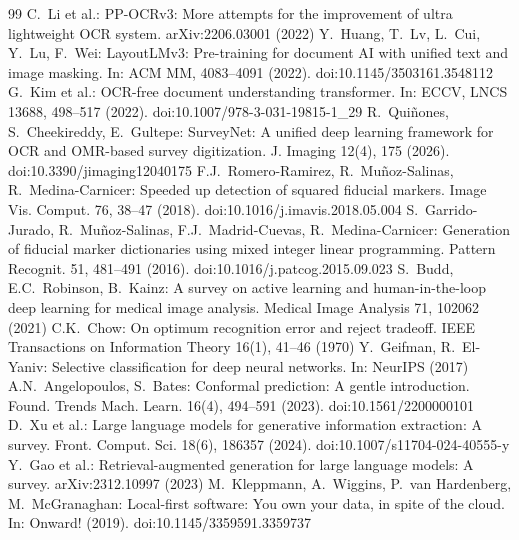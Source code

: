 \documentclass[runningheads]{llncs}
\begin{document}

\begin{thebibliography}{99}
 C.~Li et al.: PP-OCRv3: More attempts for the improvement of ultra lightweight OCR system. arXiv:2206.03001 (2022)
 Y.~Huang, T.~Lv, L.~Cui, Y.~Lu, F.~Wei: LayoutLMv3: Pre-training for document AI with unified text and image masking. In: ACM MM, 4083--4091 (2022). doi:10.1145/3503161.3548112
 G.~Kim et al.: OCR-free document understanding transformer. In: ECCV, LNCS 13688, 498--517 (2022). doi:10.1007/978-3-031-19815-1\_29
 R.~Qui{\~n}ones, S.~Cheekireddy, E.~Gultepe: SurveyNet: A unified deep learning framework for OCR and OMR-based survey digitization. J. Imaging 12(4), 175 (2026). doi:10.3390/jimaging12040175
 F.J.~Romero-Ramirez, R.~Mu{\~n}oz-Salinas, R.~Medina-Carnicer: Speeded up detection of squared fiducial markers. Image Vis. Comput. 76, 38--47 (2018). doi:10.1016/j.imavis.2018.05.004
 S.~Garrido-Jurado, R.~Mu{\~n}oz-Salinas, F.J.~Madrid-Cuevas, R.~Medina-Carnicer: Generation of fiducial marker dictionaries using mixed integer linear programming. Pattern Recognit. 51, 481--491 (2016). doi:10.1016/j.patcog.2015.09.023
 S.~Budd, E.C.~Robinson, B.~Kainz: A survey on active learning and human-in-the-loop deep learning for medical image analysis. Medical Image Analysis 71, 102062 (2021)
 C.K.~Chow: On optimum recognition error and reject tradeoff. IEEE Transactions on Information Theory 16(1), 41--46 (1970)
 Y.~Geifman, R.~El-Yaniv: Selective classification for deep neural networks. In: NeurIPS (2017)
 A.N.~Angelopoulos, S.~Bates: Conformal prediction: A gentle introduction. Found. Trends Mach. Learn. 16(4), 494--591 (2023). doi:10.1561/2200000101
 D.~Xu et al.: Large language models for generative information extraction: A survey. Front. Comput. Sci. 18(6), 186357 (2024). doi:10.1007/s11704-024-40555-y
 Y.~Gao et al.: Retrieval-augmented generation for large language models: A survey. arXiv:2312.10997 (2023)
 M.~Kleppmann, A.~Wiggins, P.~van Hardenberg, M.~McGranaghan: Local-first software: You own your data, in spite of the cloud. In: Onward! (2019). doi:10.1145/3359591.3359737
\end{thebibliography}
\end{document}

